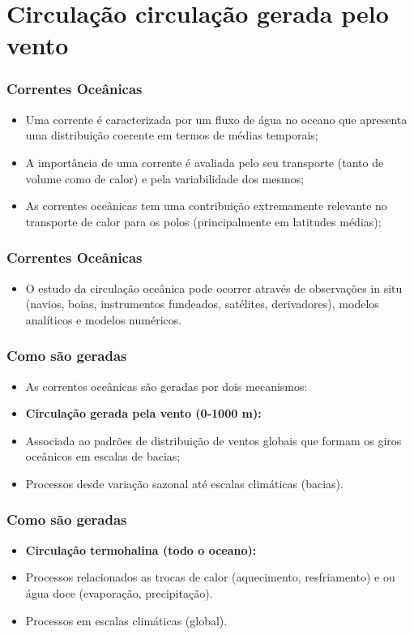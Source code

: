 \section{Circulação circulação gerada pelo vento}
\begin{frame}
\frametitle{Correntes Oceânicas}
  \begin{itemize}[<+-| alert@+>]
    \item Uma corrente é caracterizada por um fluxo de água no oceano que
          apresenta uma distribuição coerente em termos de médias temporais;
    \item A importância de uma corrente é avaliada pelo seu transporte (tanto
          de volume como de calor) e pela variabilidade dos mesmos;
    \item As correntes oceânicas tem uma contribuição extremamente relevante no
          transporte de calor para os polos (principalmente em latitudes médias);
  \end{itemize}
\end{frame}


\begin{frame}
\frametitle{Correntes Oceânicas}
  \begin{itemize}[<+-| alert@+>]
    \item O estudo da circulação oceânica pode ocorrer através de observações
          in situ (navios, boias, instrumentos fundeados, satélites,
          derivadores), modelos analíticos e modelos numéricos.
  \end{itemize}
\end{frame}


\begin{frame}
\frametitle{Como são geradas}
  \begin{itemize}[<+-| alert@+>]
    \item As correntes oceânicas são geradas por dois mecanismos:
    \item {\bf Circulação gerada pela vento (0-1000 m):}
    \item Associada ao padrões de distribuição de ventos globais que formam os
          giros oceânicos em escalas de bacias;
    \item Processos desde variação sazonal até escalas climáticas (bacias).
   \end{itemize}
\end{frame}


\begin{frame}
\frametitle{Como são geradas}
  \begin{itemize}[<+-| alert@+>]
    \item {\bf Circulação termohalina (todo o oceano):}
    \item Processos relacionados as trocas de calor (aquecimento, resfriamento)
          e ou água doce (evaporação, precipitação).
    \item Processos em escalas climáticas (global).
   \end{itemize}
\end{frame}

